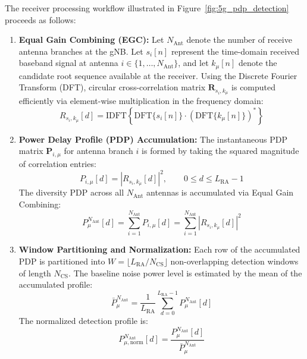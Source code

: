 The receiver processing workflow illustrated in Figure~\ref{fig:5g_pdp_detection} proceeds as follows:
\begin{enumerate}
    \item \textbf{Equal Gain Combining (EGC):} Let $N_{\mathrm{Ant}}$ denote the number of receive antenna branches at the gNB. Let $s_i[n]$ represent the time-domain received baseband signal at antenna $i \in \{1, \dots, N_{\mathrm{Ant}}\}$, and let $k_\mu[n]$ denote the candidate root sequence available at the receiver. Using the Discrete Fourier Transform (DFT), circular cross-correlation matrix $\mathbf{R}_{s_i, k_\mu}$ is computed efficiently via element-wise multiplication in the frequency domain:
    \begin{equation}
        R_{s_i, k_\mu}[d] = \mathrm{IDFT}\left\{ \mathrm{DFT}\{s_i[n]\} \cdot \left(\mathrm{DFT}\{k_\mu[n]\}\right)^* \right\}
    \end{equation}
    \item \textbf{Power Delay Profile (PDP) Accumulation:} The instantaneous PDP matrix $\mathbf{P}_{i, \mu}$ for antenna branch $i$ is formed by taking the squared magnitude of correlation entries:
    \begin{equation}
        P_{i, \mu}[d] = |R_{s_i, k_\mu}[d]|^2, \qquad 0 \le d \le L_{\mathrm{RA}} - 1
    \end{equation}
    The diversity PDP across all $N_{\mathrm{Ant}}$ antennas is accumulated via Equal Gain Combining:
    \begin{equation}
        \label{eq:egc_pdp}
        P_\mu^{N_{\mathrm{Ant}}}[d] = \sum_{i=1}^{N_{\mathrm{Ant}}} P_{i, \mu}[d] = \sum_{i=1}^{N_{\mathrm{Ant}}} |R_{s_i, k_\mu}[d]|^2
    \end{equation}
    \item \textbf{Window Partitioning and Normalization:} Each row of the accumulated PDP is partitioned into $W = \lfloor L_{\mathrm{RA}} / N_{\mathrm{CS}} \rfloor$ non-overlapping detection windows of length $N_{\mathrm{CS}}$. The baseline noise power level is estimated by the mean of the accumulated profile:
    \begin{equation}
        \bar{P}_\mu^{N_{\mathrm{Ant}}} = \frac{1}{L_{\mathrm{RA}}} \sum_{d=0}^{L_{\mathrm{RA}}-1} P_\mu^{N_{\mathrm{Ant}}}[d]
    \end{equation}
    The normalized detection profile is:
    \begin{equation}
        P_{\mu, \mathrm{norm}}^{N_{\mathrm{Ant}}}[d] = \frac{P_\mu^{N_{\mathrm{Ant}}}[d]}{\bar{P}_\mu^{N_{\mathrm{Ant}}}}

\end{equation}
\end{enumerate}
